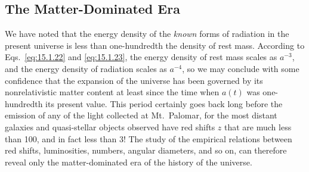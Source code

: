 
\subsection{The Matter-Dominated Era}\label{sec:15.3}

We have noted that the energy density of the \emph{known} forms of radiation
in the present universe is less than one-hundredth the density of rest mass.
According to Eqs.~\eqref{eq:15.1.22} and \eqref{eq:15.1.23}, the energy
density of rest mass scales as \(a^{-3}\), and the energy density of
radiation scales as \(a^{-4}\), so we may conclude with some confidence that
the expansion of the universe has been governed by its nonrelativistic matter
content at least since the time when \(a(t)\) was one-hundredth its present
value. This period certainly goes back long before the emission of any of the
light collected at Mt.\ Palomar, for the most distant galaxies and
quasi-stellar objects observed have red shifts \(z\) that are much less than
100, and in fact less than 3! The study of the empirical relations between red
shifts, luminosities, numbers, angular diameters, and so on, can therefore
reveal only the matter-dominated era of the history of the universe.


